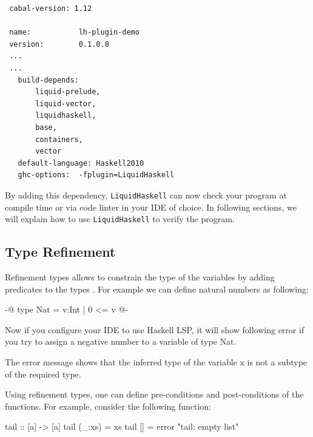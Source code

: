 \documentclass[]{rptuseminar}
\begin{document}
\vspace{1em}
\begin{lstlisting}
 cabal-version: 1.12

 name:           lh-plugin-demo
 version:        0.1.0.0
 ...
 ...
   build-depends:
       liquid-prelude,
       liquid-vector,
       liquidhaskell,
       base,
       containers,
       vector
   default-language: Haskell2010
   ghc-options:  -fplugin=LiquidHaskell
\end{lstlisting}
\vspace{1em}

By adding this dependency, \texttt{LiquidHaskell} can now check your program at compile time or via code linter in your IDE of choice.
In following sections, we will explain how to use \texttt{LiquidHaskell} to verify the program.
\subsection{Type Refinement}
Refinement types allows to constrain the type of the variables by adding predicates to the types 
\cite{jhala_programming_2020}. For example we can define natural numbers as following:

\begin{haskell}
 {-@ type Nat = {v:Int | 0 <= v} @-}
\end{haskell}

Now if you configure your IDE to use Haskell LSP, it will show following error if you try to assign a negative number
to a variable of type Nat.


The error message shows that the inferred type of the variable x is not a subtype of the required type.

Using refinement types, one can define pre-conditions and post-conditions of the functions\cite{jhala_programming_2020}. 
For example, consider the following function:

\begin{haskell}
 tail :: [a] -> [a]
 tail (_:xs) = xs
 tail [] = error "tail: empty list"
\end{haskell}
\end{document}
